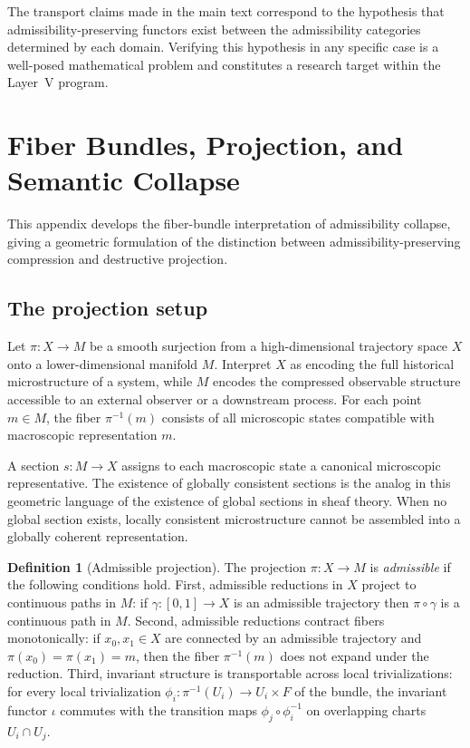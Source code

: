 \documentclass[12pt, a4paper]{article}
\theoremstyle{plain}
\theoremstyle{definition}
\newtheorem{definition}[theorem]{Definition}
\theoremstyle{remark}
\begin{document}
The transport claims made in the main text correspond to the hypothesis that
admissibility-preserving functors exist between the admissibility categories determined
by each domain. Verifying this hypothesis in any specific case is a well-posed
mathematical problem and constitutes a research target within the Layer~V program.

\section{Fiber Bundles, Projection, and Semantic Collapse}
\label{app:fiberbundle}

This appendix develops the fiber-bundle interpretation of admissibility collapse,
giving a geometric formulation of the distinction between admissibility-preserving
compression and destructive projection.

\subsection{The projection setup}

Let $\pi : X \to M$ be a smooth surjection from a high-dimensional trajectory space
$X$ onto a lower-dimensional manifold $M$. Interpret $X$ as encoding the full
historical microstructure of a system, while $M$ encodes the compressed observable
structure accessible to an external observer or a downstream process. For each point
$m \in M$, the fiber $\pi^{-1}(m)$ consists of all microscopic states compatible with
macroscopic representation $m$.

A section $s : M \to X$ assigns to each macroscopic state a canonical microscopic
representative. The existence of globally consistent sections is the analog in this
geometric language of the existence of global sections in sheaf theory. When no global
section exists, locally consistent microstructure cannot be assembled into a globally
coherent representation.

\begin{definition}[Admissible projection]
  The projection $\pi : X \to M$ is \emph{admissible} if the following conditions hold.
  First, admissible reductions in $X$ project to continuous paths in $M$: if
  $\gamma : [0,1] \to X$ is an admissible trajectory then $\pi \circ \gamma$ is a
  continuous path in $M$. Second, admissible reductions contract fibers monotonically:
  if $x_0, x_1 \in X$ are connected by an admissible trajectory and $\pi(x_0) =
  \pi(x_1) = m$, then the fiber $\pi^{-1}(m)$ does not expand under the reduction.
  Third, invariant structure is transportable across local trivializations: for every
  local trivialization $\phi_i : \pi^{-1}(U_i) \to U_i \times F$ of the bundle, the
  invariant functor $\iota$ commutes with the transition maps $\phi_j \circ \phi_i^{-1}$
  on overlapping charts $U_i \cap U_j$.
\end{definition}
\end{document}
